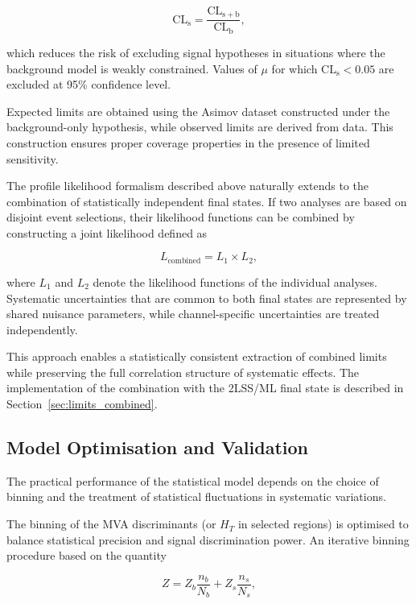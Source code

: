 \[
\mathrm{CL}_{\mathrm{s}} = 
\frac{\mathrm{CL}_{\mathrm{s+b}}}{\mathrm{CL}_{\mathrm{b}}},
\]

which reduces the risk of excluding signal hypotheses in situations where the background model is weakly constrained. 
Values of $\mu$ for which $\mathrm{CL}_{\mathrm{s}} < 0.05$ are excluded at 95\% confidence level.

Expected limits are obtained using the Asimov dataset constructed under the background-only hypothesis, while observed limits are derived from data.
This construction ensures proper coverage properties in the presence of limited sensitivity.

The profile likelihood formalism described above naturally extends to the combination of statistically independent final states. 
If two analyses are based on disjoint event selections, their likelihood functions can be combined by constructing a joint likelihood defined as

\[
L_{\mathrm{combined}} = L_{1} \times L_{2},
\]

where $L_{1}$ and $L_{2}$ denote the likelihood functions of the individual analyses. 
Systematic uncertainties that are common to both final states are represented by shared nuisance parameters, while channel-specific uncertainties are treated independently.

This approach enables a statistically consistent extraction of combined limits while preserving the full correlation structure of systematic effects. 
The implementation of the combination with the 2LSS/ML final state is described in Section~\ref{sec:limits_combined}.


\subsection{Model Optimisation and Validation}

The practical performance of the statistical model depends on the choice of binning and the treatment of statistical fluctuations in systematic variations.

The binning of the MVA discriminants (or $H_T$ in selected regions) is optimised to balance statistical precision and signal discrimination power. 
An iterative binning procedure based on the quantity

\begin{equation}
Z = Z_b \frac{n_b}{N_b} + Z_s \frac{n_s}{N_s},
\end{equation}

